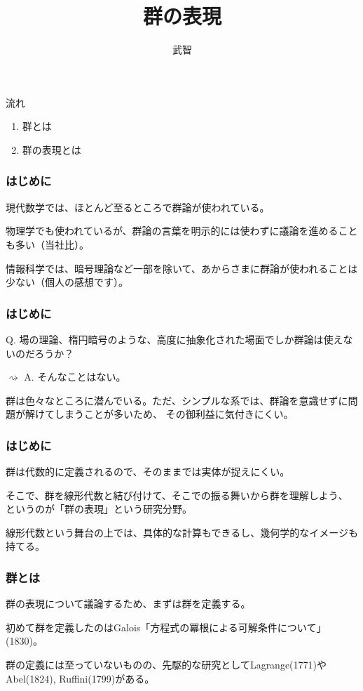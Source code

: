\documentclass[12pt, t]{beamer}
\title{群の表現}
\author{武智}
\begin{document}
\frame{\maketitle}

\begin{frame}{流れ}
\begin{enumerate}
\item 群とは
\item 群の表現とは
\end{enumerate}
\end{frame}

\begin{frame}
\frametitle{はじめに}
現代数学では、ほとんど至るところで群論が使われている。

物理学でも使われているが、群論の言葉を明示的には使わずに議論を進めることも多い（当社比）。

情報科学では、暗号理論など一部を除いて、あからさまに群論が使われることは少ない（個人の感想です）。
\end{frame}

\begin{frame}
\frametitle{はじめに}
Q. 場の理論、楕円暗号のような、高度に抽象化された場面でしか群論は使えないのだろうか？

\vspace{1\zw}
$\rightsquigarrow$ A. そんなことはない。

群は色々なところに潜んでいる。ただ、シンプルな系では、群論を意識せずに問題が解けてしまうことが多いため、
その御利益に気付きにくい。
\end{frame}

\begin{frame}
\frametitle{はじめに}
群は代数的に定義されるので、そのままでは実体が捉えにくい。

そこで、群を線形代数と結び付けて、そこでの振る舞いから群を理解しよう、
というのが「群の表現」という研究分野。

線形代数という舞台の上では、具体的な計算もできるし、幾何学的なイメージも持てる。
\end{frame}

\begin{frame}
\frametitle{群とは}
群の表現について議論するため、まずは群を定義する。

初めて群を定義したのはGalois「方程式の冪根による可解条件について」(1830)。

群の定義には至っていないものの、先駆的な研究としてLagrange(1771)やAbel(1824), Ruffini(1799)がある。
\end{frame}
\end{document}
